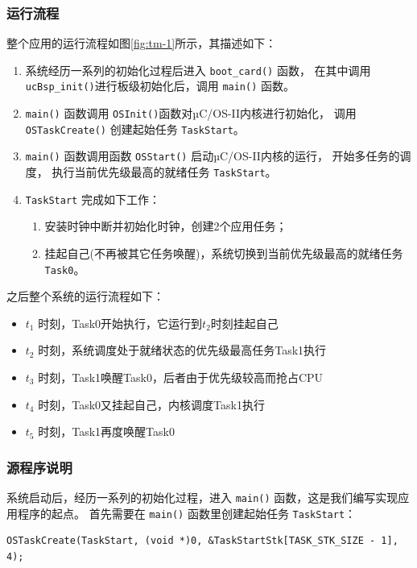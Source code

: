 \documentclass{ctexart}
\begin{document}
    \subsubsection{运行流程}
    整个应用的运行流程如图\ref{fig:tm-1}所示，其描述如下：
    \begin{enumerate}
        \item 系统经历一系列的初始化过程后进入 \lstinline|boot_card()| 函数，
            在其中调用\lstinline|ucBsp_init()|进行板级初始化后，调用 \lstinline|main()| 函数。
        \item \lstinline|main()| 函数调用 \lstinline|OSInit()|函数对µC/OS-II内核进行初始化，
            调用\lstinline|OSTaskCreate()| 创建起始任务 \verb|TaskStart|。
        \item \lstinline|main()| 函数调用函数 \lstinline|OSStart()| 启动µC/OS-II内核的运行，
            开始多任务的调度， 执行当前优先级最高的就绪任务 \verb|TaskStart|。
        \item \verb|TaskStart| 完成如下工作：
            \begin{enumerate}
                \item 安装时钟中断并初始化时钟，创建2个应用任务；
                \item 挂起自己(不再被其它任务唤醒)，系统切换到当前优先级最高的就绪任务 \verb|Task0|。
            \end{enumerate}
    \end{enumerate}

    之后整个系统的运行流程如下：
    \begin{itemize}
        \item $t_1$ 时刻，Task0开始执行，它运行到$t_2$时刻挂起自己
        \item $t_2$ 时刻，系统调度处于就绪状态的优先级最高任务Task1执行
        \item $t_3$ 时刻，Task1唤醒Task0，后者由于优先级较高而抢占CPU
        \item $t_4$ 时刻，Task0又挂起自己，内核调度Task1执行
        \item $t_5$ 时刻，Task1再度唤醒Task0
    \end{itemize}
    \subsubsection{源程序说明}
    系统启动后，经历一系列的初始化过程，进入 \lstinline|main()| 函数，这是我们编写实现应用程序的起点。
    首先需要在 \lstinline|main()| 函数里创建起始任务 \verb|TaskStart|：
    \begin{lstlisting}
OSTaskCreate(TaskStart, (void *)0, &TaskStartStk[TASK_STK_SIZE - 1], 4);
    \end{lstlisting}
    
\end{document}
